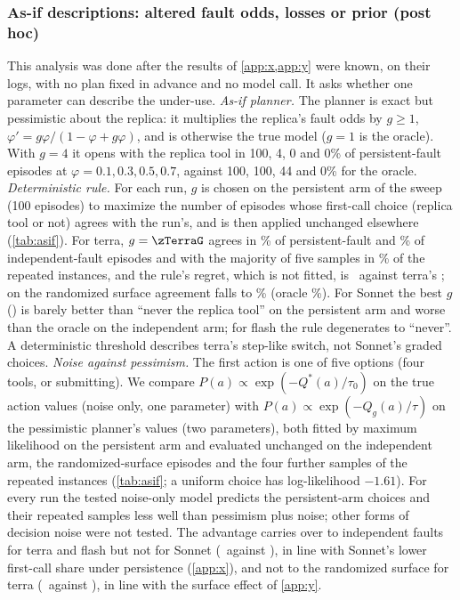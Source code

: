 \subsubsection{As-if descriptions: altered fault odds, losses or prior (post hoc)}\label{app:asif}
This analysis was done after the results of \cref{app:x,app:y} were known, on their logs, with no plan fixed in advance and no model call. It asks whether one parameter can describe the under-use.
\emph{As-if planner.} The planner is exact but pessimistic about the replica: it multiplies the replica's fault odds by $g\ge1$, $\varphi'=g\varphi/(1-\varphi+g\varphi)$, and is otherwise the true model ($g=1$ is the oracle). With $g=4$ it opens with the replica tool in 100, 4, 0 and 0\% of persistent-fault episodes at $\varphi=0.1,0.3,0.5,0.7$, against 100, 100, 44 and 0\% for the oracle.
\emph{Deterministic rule.} For each run, $g$ is chosen on the persistent arm of the sweep (100 episodes) to maximize the number of episodes whose first-call choice (replica tool or not) agrees with the run's, and is then applied unchanged elsewhere (\cref{tab:asif}). For terra, $g=\zTerraG$ agrees in \zTerraMatchFit\% of persistent-fault and \zTerraMatchIndep\% of independent-fault episodes and with the majority of five samples in \zTerraMatchRep\% of the repeated instances, and the rule's regret, which is not fitted, is \zTerraRegretAsif\ against terra's \zTerraRegretObs; on the randomized surface agreement falls to \zTerraMatchRand\% (oracle \zTerraOracleMatchRand\%). For Sonnet the best $g$ (\zSonnetG) is barely better than ``never the replica tool'' on the persistent arm and worse than the oracle on the independent arm; for flash the rule degenerates to ``never''. A deterministic threshold describes terra's step-like switch, not Sonnet's graded choices.
\emph{Noise against pessimism.} The first action is one of five options (four tools, or submitting). We compare $P(a)\propto\exp(-Q^*(a)/\tau_0)$ on the true action values (noise only, one parameter) with $P(a)\propto\exp(-Q_g(a)/\tau)$ on the pessimistic planner's values (two parameters), both fitted by maximum likelihood on the persistent arm and evaluated unchanged on the independent arm, the randomized-surface episodes and the four further samples of the repeated instances (\cref{tab:asif}; a uniform choice has log-likelihood $-1.61$). For every run the tested noise-only model predicts the persistent-arm choices and their repeated samples less well than pessimism plus noise; other forms of decision noise were not tested. The advantage carries over to independent faults for terra and flash but not for Sonnet (\zSonnetLLPessIndep\ against \zSonnetLLNoiseIndep), in line with Sonnet's lower first-call share under persistence (\cref{app:x}), and not to the randomized surface for terra (\zTerraLLPessRand\ against \zTerraLLNoiseRand), in line with the surface effect of \cref{app:y}.
